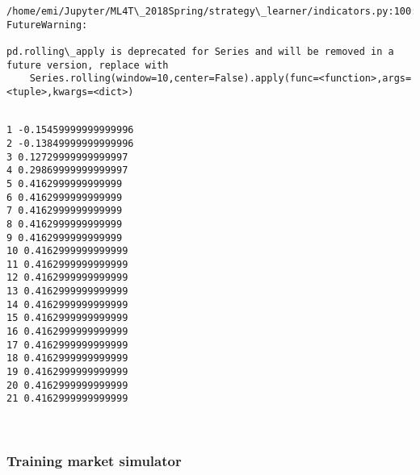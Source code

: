 \documentclass[11pt]{article}
\begin{document}
    \begin{Verbatim}[commandchars=\\\{\}]
/home/emi/Jupyter/ML4T\_2018Spring/strategy\_learner/indicators.py:100: FutureWarning:

pd.rolling\_apply is deprecated for Series and will be removed in a future version, replace with 
	Series.rolling(window=10,center=False).apply(func=<function>,args=<tuple>,kwargs=<dict>)


    \end{Verbatim}

    \begin{Verbatim}[commandchars=\\\{\}]
1 -0.15459999999999996
2 -0.13849999999999996
3 0.12729999999999997
4 0.29869999999999997
5 0.4162999999999999
6 0.4162999999999999
7 0.4162999999999999
8 0.4162999999999999
9 0.4162999999999999
10 0.4162999999999999
11 0.4162999999999999
12 0.4162999999999999
13 0.4162999999999999
14 0.4162999999999999
15 0.4162999999999999
16 0.4162999999999999
17 0.4162999999999999
18 0.4162999999999999
19 0.4162999999999999
20 0.4162999999999999
21 0.4162999999999999

    \end{Verbatim}

    \begin{center}
    \end{center}
    { \hspace*{\fill} \\}
    
    \subsubsection{Training market
simulator}\label{training-market-simulator}
\end{document}
